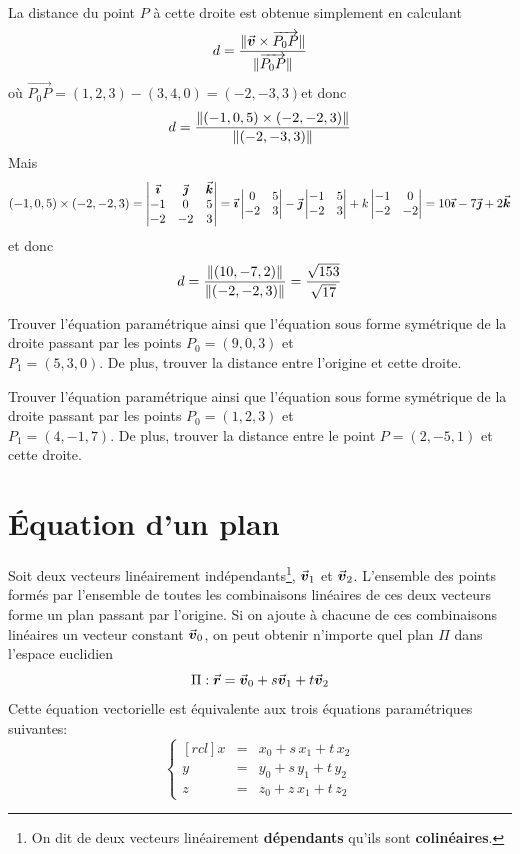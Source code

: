 \begin{exemple}
La distance du point $P$ à cette droite est obtenue simplement en calculant
\[
d = \frac{\lVert\vec{\boldsymbol{v}} \times \overrightarrow{P_0 P}\rVert}{\lVert\overrightarrow{P_0 P}\rVert}
\]
où $\overrightarrow{P_0 P} = (1,2,3)-(3,4,0)= (-2,-3,3)$et donc
\[
d = \frac{\lVert(-1,0,5)\times (-2,-2,3)\rVert}{\lVert(-2,-3,3)\rVert}
\]
Mais
\[
(-1,0,5)\times (-2,-2,3) = \begin{vmatrix}
\vec{\boldsymbol{\imath}} & \vec{\boldsymbol{\jmath}} & \vec{\boldsymbol{k}} \\
-1 & 0 & 5 \\
-2 & -2& 3
\end{vmatrix}
=
\vec{\boldsymbol{\imath}}\begin{vmatrix}
0 & 5 \\
-2 & 3
\end{vmatrix}
- \vec{\boldsymbol{\jmath}}\begin{vmatrix}
-1 & 5 \\
-2 & 3
\end{vmatrix} + k\begin{vmatrix}
-1 & 0 \\
-2 & -2
\end{vmatrix}
=
10\vec{\boldsymbol{\imath}} -7\vec{\boldsymbol{\jmath}} + 2\vec{\boldsymbol{k}}
\]
et donc
\[
d = \frac{\lVert(10,-7,2)\rVert}{\lVert(-2,-2,3)\rVert} = \frac{\sqrt{153}}{\sqrt{17}}
\]
\end{exemple}

\begin{exerciceC}
Trouver l'équation paramétrique ainsi que l'équation sous forme symétrique de la droite
passant par les points $P_0 = (9,0,3)$ et\\ $P_1 = (5,3,0)$.  De plus, trouver la distance entre
l'origine et cette droite.
\end{exerciceC}
\begin{exerciceC}
Trouver l'équation paramétrique ainsi que l'équation sous forme symétrique de la droite
passant par les points $P_0 = (1, 2, 3)$ et\\ $P_1 = (4, -1, 7)$.  De plus, trouver la distance entre
le point $P=(2,-5,1)$ et cette droite.
\end{exerciceC}


\section{Équation d'un plan}

Soit deux vecteurs linéairement indépendants\footnote{On dit de deux vecteurs linéairement \textbf{dépendants} qu'ils sont \textbf{colinéaires}.}, $\vec{\boldsymbol{v}}_1$ et $\vec{\boldsymbol{v}}_2$.  L'ensemble des points formés par l'ensemble de toutes
les combinaisons linéaires de ces deux vecteurs forme un plan passant par l'origine.  Si on ajoute à chacune
de ces combinaisons linéaires un vecteur constant $\vec{\boldsymbol{v}}_0$, on peut obtenir n'importe quel plan $\Pi$
dans l'espace euclidien
\[
\Pi: \vec{\boldsymbol{r}} = \vec{\boldsymbol{v}}_0 + s\vec{\boldsymbol{v}}_1 + t\vec{\boldsymbol{v}}_2 
\]
Cette équation vectorielle est équivalente aux trois équations paramétriques suivantes:
\[
\left\{ \begin{matrix}[rcl]
x &=& x_0 + s\,x_1 + t\,x_2 \\
y &=& y_0 + s\,y_1 + t\,y_2 \\
z &=& z_0 + z\,x_1 + t\,z_2 
\end{matrix}\right.
\]

